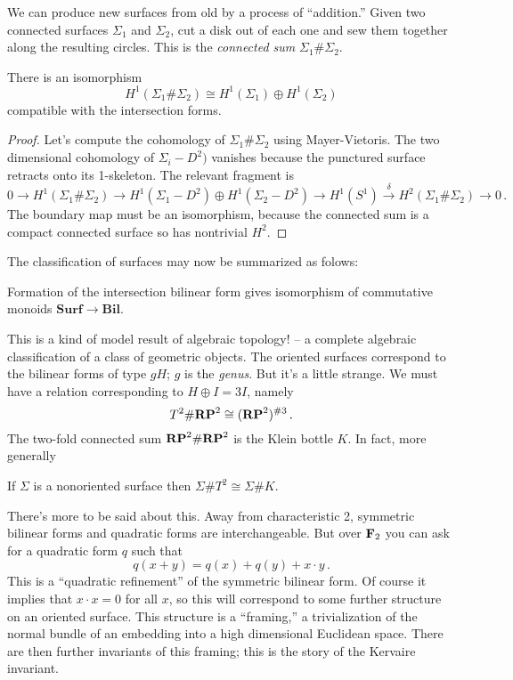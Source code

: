 We can produce new surfaces from old by a process of ``addition.''
Given two connected surfaces $\Sigma_1$ and $\Sigma_2$, 
cut a disk out of each one and
sew them together along the resulting circles. This is the 
{\em connected sum} $\Sigma_1\#\Sigma_2$. 
\begin{prop} 
There is an isomorphism 
\[
H^1(\Sigma_1\#\Sigma_2)\cong H^1(\Sigma_1)\oplus H^1(\Sigma_2)
\]
compatible with the intersection forms. 
\end{prop}
\begin{proof}
Let's compute the cohomology of $\Sigma_1\#\Sigma_2$ using Mayer-Vietoris. 
The two dimensional cohomology of $\Sigma_i-D^2)$ vanishes because the 
punctured surface retracts onto its 1-skeleton. The relevant fragment is
\[
0\to H^1(\Sigma_1\#\Sigma_2)\to H^1(\Sigma_1-D^2)\oplus H^1(\Sigma_2-D^2)\to
H^1(S^1)\xrightarrow{\delta} H^2(\Sigma_1\#\Sigma_2)\to0\,.
\]
The boundary map must be an isomorphism, because the connected sum is a
compact connected surface so has nontrivial $H^2$.
\end{proof} 
The classification of surfaces may now be summarized as folows:
\begin{theorem}
Formation of the intersection bilinear form gives isomorphism of 
commutative monoids $\mathbf{Surf}\to\mathbf{Bil}$.
\end{theorem}
This is a kind of model result of algebraic topology! -- a complete
algebraic classification of a class of geometric objects. The oriented
surfaces correspond to the bilinear forms of type $gH$; $g$ is the
{\em genus}. But it's a little
strange. We must have a relation corresponding to $H\oplus I=3I$, namely
\[
T^2\#\mathbf{RP}^2\cong(\mathbf{RP}^2)^{\# 3}\,.
\]
The two-fold connected sum $\mathbf{RP}^2\#\mathbf{RP}^2$ is the Klein bottle $K$.  
In fact, more generally
\begin{claim}
If $\Sigma$ is a nonoriented surface then $\Sigma\# T^2\cong\Sigma\# K$.
\end{claim}

There's more to be said about this. Away from characteristic 2, symmetric
bilinear forms
and quadratic forms are interchangeable. But over $\mathbf F_2$ you can ask for
a quadratic form $q$ such that 
\[
q(x+y)=q(x)+q(y)+x\cdot y\,.
\]
This is a ``quadratic refinement'' of the symmetric bilinear form.
Of course it implies that $x\cdot x=0$ for all $x$, so this will
correspond to some further structure on an oriented surface. This 
structure is a ``framing,'' a trivialization of the normal bundle of
an embedding into a high dimensional Euclidean space. There are then
further invariants of this framing; this is the story of the Kervaire
invariant.

